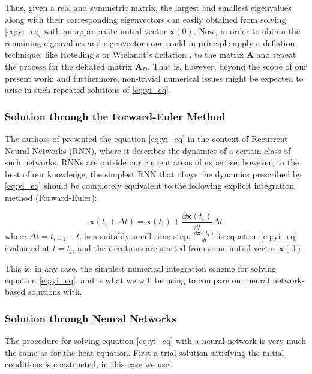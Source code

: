 \documentclass[reprint, english, nofootinbib]{revtex4-2}
\begin{document}
Thus, given a real and symmetric matrix, the largest and smallest eigenvalues along with their corresponding eigenvectors can easily obtained from solving \ref{eq:yi_eq} with an appropriate initial vector $\pmb{x}(0)$. Now, in order to obtain the remaining eigenvalues and eigenvectors one could in principle apply a deflation technique, like Hotelling's or Wielandt's deflation \cite{Saad_2011} \cite{Roberts}, to the matrix $\mathbf{A}$ and repeat the process for the deflated matrix $\mathbf{A}_D$. That is, however, beyond the scope of our present work; and furthermore, non-trivial numerical issues might be expected to arise in such repeated solutions of \ref{eq:yi_eq}.

\subsubsection{Solution through the Forward-Euler Method}
\noindent
The authors of \cite{Yi_2004} presented the equation \ref{eq:yi_eq} in the context of Recurrent Neural Networks (RNN), where it describes the dynamics of a certain class of such networks. RNNs are outside our current areas of expertise; however, to the best of our knowledge, the simplest RNN that obeys the dynamics prescribed by \ref{eq:yi_eq} should be completely equivalent to the following explicit integration method (Forward-Euler):

\begin{equation}
    \label{eq:yi_euler}
    \pmb{x}(t_{i} + \Delta t) = \pmb{x}(t_i) + \frac{\dd \pmb{x}(t_i)}{\dd t}  \Delta t
\end{equation}
where $\Delta t = t_{i+1} -t_{i}$ is a suitably small time-step,  $\frac{d \pmb{x}(t_i)}{dt}$ is equation \ref{eq:yi_eq} evaluated at $t=t_i$, and the iterations are started from some initial vector $\pmb{x}(0)$.

This is, in any case, the simplest numerical integration scheme for solving equation \ref{eq:yi_eq}, and is what we will be using to compare our neural network-based solutions with.

\subsubsection{Solution through Neural Networks}
\noindent
The procedure for solving equation \ref{eq:yi_eq} with a neural network is very much the same as for the heat equation. First a trial solution satisfying the initial conditions is constructed, in this case we use:
\end{document}
